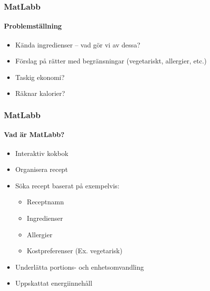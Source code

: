 %
%

\begin{frame}
  \frametitle{MatLabb}
  \framesubtitle{Problemställning}
  \begin{itemize}
    \item<2-> Kända ingredienser -- vad gör vi av dessa?
    \item<3-> Förslag på rätter med begränsningar (vegetariskt, allergier, etc.)
    \item<4-> Taskig ekonomi? 
    \item<5-> Räknar kalorier?
  \end{itemize}
\end{frame}

\begin{frame}
  \frametitle{MatLabb}
  \framesubtitle{Vad är MatLabb?}
  \begin{itemize}
    \item<1-> Interaktiv kokbok
    \item<2-> Organisera recept
    \item<3-> Söka recept baserat på exempelvis:
      \begin{itemize}
        \item Receptnamn
        \item Ingredienser
        \item Allergier
        \item Kostpreferenser (Ex. vegetarisk)
      \end{itemize}
    \item<4-> Underlätta portions- och enhetsomvandling
    \item<5-> Uppskattat energiinnehåll
  \end{itemize}
\end{frame}
